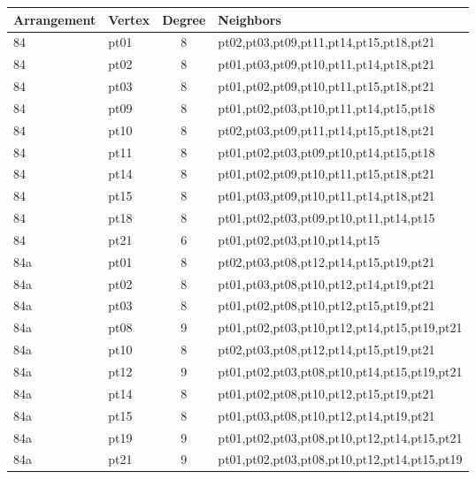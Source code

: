 \begin{tabularx}{\textwidth}{@{}llcX@{}}
\toprule
Arrangement & Vertex & Degree & Neighbors \\
\midrule
84 & pt01 & 8 & pt02,pt03,pt09,pt11,pt14,pt15,pt18,pt21 \\
84 & pt02 & 8 & pt01,pt03,pt09,pt10,pt11,pt14,pt18,pt21 \\
84 & pt03 & 8 & pt01,pt02,pt09,pt10,pt11,pt15,pt18,pt21 \\
84 & pt09 & 8 & pt01,pt02,pt03,pt10,pt11,pt14,pt15,pt18 \\
84 & pt10 & 8 & pt02,pt03,pt09,pt11,pt14,pt15,pt18,pt21 \\
84 & pt11 & 8 & pt01,pt02,pt03,pt09,pt10,pt14,pt15,pt18 \\
84 & pt14 & 8 & pt01,pt02,pt09,pt10,pt11,pt15,pt18,pt21 \\
84 & pt15 & 8 & pt01,pt03,pt09,pt10,pt11,pt14,pt18,pt21 \\
84 & pt18 & 8 & pt01,pt02,pt03,pt09,pt10,pt11,pt14,pt15 \\
84 & pt21 & 6 & pt01,pt02,pt03,pt10,pt14,pt15 \\
84a & pt01 & 8 & pt02,pt03,pt08,pt12,pt14,pt15,pt19,pt21 \\
84a & pt02 & 8 & pt01,pt03,pt08,pt10,pt12,pt14,pt19,pt21 \\
84a & pt03 & 8 & pt01,pt02,pt08,pt10,pt12,pt15,pt19,pt21 \\
84a & pt08 & 9 & pt01,pt02,pt03,pt10,pt12,pt14,pt15,pt19,pt21 \\
84a & pt10 & 8 & pt02,pt03,pt08,pt12,pt14,pt15,pt19,pt21 \\
84a & pt12 & 9 & pt01,pt02,pt03,pt08,pt10,pt14,pt15,pt19,pt21 \\
84a & pt14 & 8 & pt01,pt02,pt08,pt10,pt12,pt15,pt19,pt21 \\
84a & pt15 & 8 & pt01,pt03,pt08,pt10,pt12,pt14,pt19,pt21 \\
84a & pt19 & 9 & pt01,pt02,pt03,pt08,pt10,pt12,pt14,pt15,pt21 \\
84a & pt21 & 9 & pt01,pt02,pt03,pt08,pt10,pt12,pt14,pt15,pt19 \\
\bottomrule
\end{tabularx}
